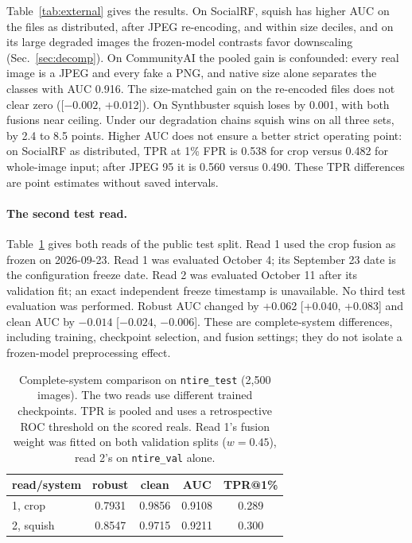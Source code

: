 \documentclass[letterpaper]{article} %
\begin{document}
Table~\ref{tab:external} gives the results. On SocialRF, squish has higher AUC on the files as distributed, after JPEG re-encoding, and within size deciles, and on
its large degraded images the frozen-model contrasts favor downscaling
(Sec.~\ref{sec:decomp}). On CommunityAI the pooled gain is confounded: every
real image is a JPEG and every fake a PNG, and native size alone separates
the classes with AUC 0.916. The size-matched gain on the re-encoded files does
not clear zero ([$-0.002$, +0.012]). On Synthbuster squish loses by 0.001,
with both fusions near ceiling. Under our degradation chains squish wins on
all three sets, by 2.4 to 8.5 points. Higher AUC does not ensure a better strict operating point: on SocialRF as distributed, TPR at 1\% FPR is 0.538 for crop versus 0.482 for whole-image input; after JPEG 95 it is 0.560 versus 0.490. These TPR differences are point estimates without saved intervals.

\paragraph{The second test read.} Table~\ref{tab:test} gives both reads of
the public test split. Read 1 used the crop fusion as frozen on 2026-09-23.
Read 1 was evaluated October 4; its September 23 date is the configuration freeze date. Read 2 was evaluated October 11 after its validation fit; an exact independent freeze timestamp is unavailable. No third test evaluation was performed. Robust AUC changed by +0.062 [+0.040, +0.083] and clean AUC by $-0.014$ [$-0.024$, $-0.006$]. These are complete-system
differences, including training, checkpoint selection, and fusion settings;
they do not isolate a frozen-model preprocessing effect. \begin{table}[t]
\centering
\small
\begin{tabular}{lcccc}
\toprule
read/system & robust & clean & AUC & TPR@1\% \\
\midrule
1, crop & 0.7931 & 0.9856 & 0.9108 & 0.289 \\
2, squish & 0.8547 & 0.9715 & 0.9211 & 0.300 \\
\bottomrule
\end{tabular}
\caption{Complete-system comparison on \texttt{ntire\_test} (2,500 images).
The two reads use different trained checkpoints. TPR is pooled and uses a retrospective ROC threshold on the scored reals. Read 1's fusion
weight was fitted on both validation splits ($w = 0.45$), read 2's on
\texttt{ntire\_val} alone.}
\label{tab:test}
\end{table}
\end{document}
